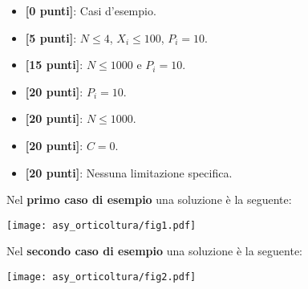 \begin{itemize}[nolistsep,itemsep=2mm]
  \item \textbf{ [\phantom{0}0 punti]}: Casi d'esempio.
  \item \textbf{ [\phantom{0}5 punti]}: $N \leq 4$, $X_i \leq 100$, $P_i = 10$.
  \item \textbf{ [15 punti]}: $N \leq 1000$ e $P_i = 10$.
  \item \textbf{ [20 punti]}: $P_i = 10$.
  \item \textbf{ [20 punti]}: $N \leq 1000$.
  \item \textbf{ [20 punti]}: $C = 0$.
  \item \textbf{ [20 punti]}: Nessuna limitazione specifica.
\end{itemize}



\Examples

\begin{example}
%
%
\end{example}



\Explanation

Nel \textbf{primo caso di esempio} una soluzione è la seguente: \\[-22pt]
%
\begin{center}
\texttt{[image: asy\_orticoltura/fig1.pdf]}
\end{center}

Nel \textbf{secondo caso di esempio} una soluzione è la seguente:
%
\begin{center}
\texttt{[image: asy\_orticoltura/fig2.pdf]}
\end{center}
